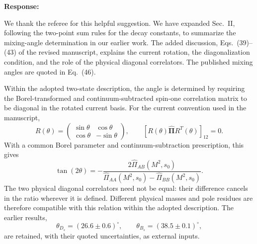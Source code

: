 
\noindent\textbf{Response:}

We thank the referee for this helpful suggestion. We have expanded
Sec.~II, following the two-point sum rules for the decay constants, to
summarize the mixing-angle determination in our earlier work. The added
discussion, Eqs.~(39)--(43) of the revised manuscript, explains the
current rotation, the diagonalization condition, and the role of the
physical diagonal correlators. The published mixing angles are quoted
in Eq.~(46).

Within the adopted two-state description, the angle is determined by
requiring the Borel-transformed and continuum-subtracted spin-one
correlation matrix to be diagonal in the rotated current basis.
For the current convention used in the manuscript,
\begin{equation}
R(\theta)=
\begin{pmatrix}
\sin\theta & \cos\theta\\
\cos\theta & -\sin\theta
\end{pmatrix},
\qquad
\left[R(\theta)\widehat{\boldsymbol\Pi}R^T(\theta)\right]_{12}=0.
\end{equation}
With a common Borel parameter and continuum-subtraction prescription,
this gives
\begin{equation}
\tan(2\theta)=-\frac{2\widehat\Pi_{AB}(M^2,s_0)}
{\widehat\Pi_{AA}(M^2,s_0)-\widehat\Pi_{BB}(M^2,s_0)}.
\end{equation}
The two physical diagonal correlators need not be equal: their
difference cancels in the ratio wherever it is defined. Different
physical masses and pole residues are therefore compatible with this
relation within the adopted description. The earlier results,
\begin{equation}
\theta_{D_s}=(26.6\pm0.6)^\circ,
\qquad
\theta_{B_s}=(38.5\pm0.1)^\circ,
\end{equation}
are retained, with their quoted uncertainties, as external inputs.

